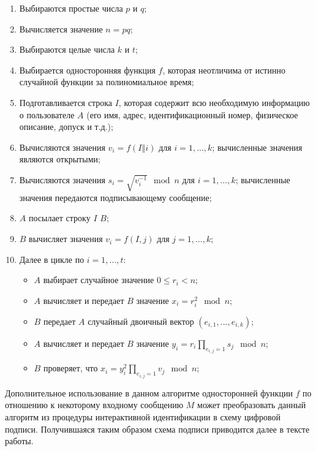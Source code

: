\documentclass{./civarticle}
\begin{document}
\begin{enumerate}
    \item Выбираются простые числа $p$ и $q$;
    \item Вычисляется значение $n = pq$;
    \item Выбираются целые числа $k$ и $t$;
    \item Выбирается односторонняя функция $f$, которая неотличима от истинно случайной функции за полиномиальное время;
    \item Подготавливается строка $I$, которая содержит всю необходимую информацию о пользователе $A$ (его имя, адрес, идентификационный номер, физическое описание, допуск и т.д.);

    \item Вычисляются значения $v_i = f(I \mathbin\Vert i)$ для $i = 1, ..., k$; вычисленные значения являются открытыми;
    \item Вычисляются значения $s_i = \sqrt{v_i^{-1}} \mod n$ для $i = 1, ..., k$; вычисленные значения передаются подписывающему сообщение;
    
    \item $A$ посылает строку $I$ $B$;
    \item $B$ вычисляет значения $v_i = f(I, j)$ для $j = 1, ..., k$;
    \item Далее в цикле по $i = 1, ..., t$:

    \begin{itemize}
        \item $A$ выбирает случайное значение $0 \leq r_i < n$;
        \item $A$ вычисляет и передает $B$ значение $x_i = r_i^2 \mod n$;
        \item $B$ передает $A$ случайный двоичный вектор $(e_{i, 1}, ..., e_{i, k})$;
        \item $A$ вычисляет и передает $B$ значение $y_i = r_i \prod\limits_{e_{i, j} = 1} s_j \mod n$;
        \item $B$ проверяет, что $x_i = y_i^2 \prod\limits_{e_{i, j} = 1} v_j \mod n$;
    \end{itemize}
    
\end{enumerate}

Дополнительное использование в данном алгоритме односторонней функции $f$ по отношению к некоторому входному сообщению $M$ может преобразовать данный алгоритм из процедуры интерактивной идентификации в схему цифровой подписи. Получившаяся таким образом схема подписи приводится далее в тексте работы.
\end{document}
